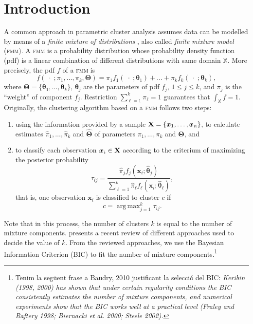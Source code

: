 \documentclass[submit]{smj}
\DeclareMathOperator*{\argmax}{arg\,max}
\theoremstyle{definition}
\newcommand{\m}[1]{\boldsymbol{#1}}
\newcommand{\fmm}{\textsc{fmm}\xspace}
\newcommand{\X}{\text{\textbf{X}}}
\begin{document}



\maketitle

\section{Introduction}


A common approach in parametric cluster analysis assumes data can be modelled by means of a \emph{finite mixture of distributions} \citep{fraley2002model, punzo2014flexible}, also called \emph{finite mixture model} (\fmm). A \fmm is a probability distribution whose probability density function (pdf) is a linear combination of different distributions with same domain $\mathbb{X}$. More precisely, the pdf $f$ of a \fmm is
\begin{equation}\label{mixt}
f(\;\cdot\; ; \pi_1, \dots, \pi_k, \m\Theta) = \pi_1 f_1(\;\cdot\; ; \m\theta_1) + \dots + \pi_k f_k(\;\cdot\; ; \m\theta_k),
\end{equation}
where $\m\Theta =\{ \m\theta_1, \dots, \m\theta_k\}$, $\m\theta_j$ are the parameters of pdf $f_j$, $1\leq j \leq k$, and $\pi_j$ is the ``weight'' of component $f_j$. Restriction $\sum_{\ell = 1}^k \pi_\ell = 1$ guarantees that  $\int_{\mathbb{X}}f = 1$. Originally, the clustering algorithm based on a \fmm follows two steps:
\begin{enumerate}
\item using the information provided by a sample $\X=\{\m x_1, \dots, \m x_n\}$, to calculate estimates $\hat{\pi}_1, \dots, \hat{\pi}_k$ and $\hat{\m\Theta}$ of parameters $\pi_1, \dots, \pi_k$ and $\m\Theta$, and
\item to classify each observation $\m x_i \in \X$ according to the criterium of maximizing the posterior probability
\[
\tau_{ij}= \frac{ \hat{\pi}_j f_j(\m x_i ; \hat{\m\theta}_j) }{\sum_{\ell=1}^k \hat{\pi}_\ell f_\ell(\m x_i ; \hat{\m\theta}_\ell) },
\]
that is, one observation $\m x_i$ is classified to cluster $c$ if
\begin{equation}\label{map_criteria}
c = \argmax_{j=1}^k \tau_{ij}.
\end{equation}
\end{enumerate}
Note that in this process, the number of clusters $k$ is equal to the number of mixture components. \cite{mclachlan2014components} presents a recent review of different approaches used to decide the value of $k$. From the reviewed approaches, we use the Bayesian Information Criterion (BIC) to fit the number of mixture components.\footnote{Tenim la següent frase a Baudry, 2010 justificant la selecció del BIC: \emph{Keribin (1998, 2000) has shown that under certain regularity conditions
the BIC consistently estimates the number of mixture components, and numerical experiments
show that the BIC works well at a practical level (Fraley and Raftery 1998; Biernacki et al.
2000; Steele 2002).}}
\end{document}
